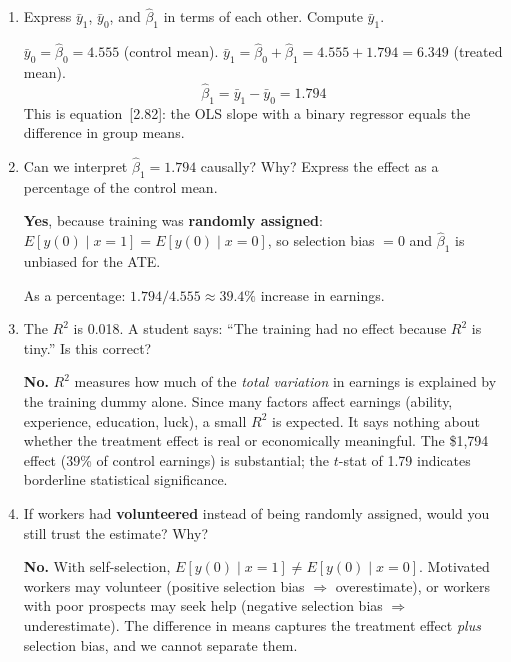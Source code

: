 \documentclass[11pt,a4paper]{article}
\begin{document}
\begin{enumerate}[label=(\alph*)]
\item Express $\bar{y}_1$, $\bar{y}_0$, and $\hat{\beta}_1$ in terms of each other. Compute $\bar{y}_1$.

\begin{solution}
$\bar{y}_0 = \hat{\beta}_0 = 4.555$ (control mean). $\bar{y}_1 = \hat{\beta}_0 + \hat{\beta}_1 = 4.555 + 1.794 = 6.349$ (treated mean).
\[
  \hat{\beta}_1 = \bar{y}_1 - \bar{y}_0 = 1.794
\]
This is equation~[2.82]: the OLS slope with a binary regressor equals the difference in group means.
\end{solution}

\item Can we interpret $\hat{\beta}_1 = 1.794$ causally? Why? Express the effect as a percentage of the control mean.

\begin{solution}
\textbf{Yes}, because training was \textbf{randomly assigned}: $E[y(0) \mid x{=}1] = E[y(0) \mid x{=}0]$, so selection bias $= 0$ and $\hat{\beta}_1$ is unbiased for the ATE.

As a percentage: $1.794 / 4.555 \approx 39.4\%$ increase in earnings.
\end{solution}

\item The $R^2$ is 0.018. A student says: ``The training had no effect because $R^2$ is tiny.'' Is this correct?

\begin{solution}
\textbf{No.} $R^2$ measures how much of the \emph{total variation} in earnings is explained by the training dummy alone. Since many factors affect earnings (ability, experience, education, luck), a small $R^2$ is expected. It says nothing about whether the treatment effect is real or economically meaningful. The \$1{,}794 effect (39\% of control earnings) is substantial; the $t$-stat of 1.79 indicates borderline statistical significance.
\end{solution}

\item If workers had \textbf{volunteered} instead of being randomly assigned, would you still trust the estimate? Why?

\begin{solution}
\textbf{No.} With self-selection, $E[y(0) \mid x{=}1] \neq E[y(0) \mid x{=}0]$. Motivated workers may volunteer (positive selection bias $\Rightarrow$ overestimate), or workers with poor prospects may seek help (negative selection bias $\Rightarrow$ underestimate). The difference in means captures the treatment effect \emph{plus} selection bias, and we cannot separate them.
\end{solution}
\end{enumerate}
\end{document}

